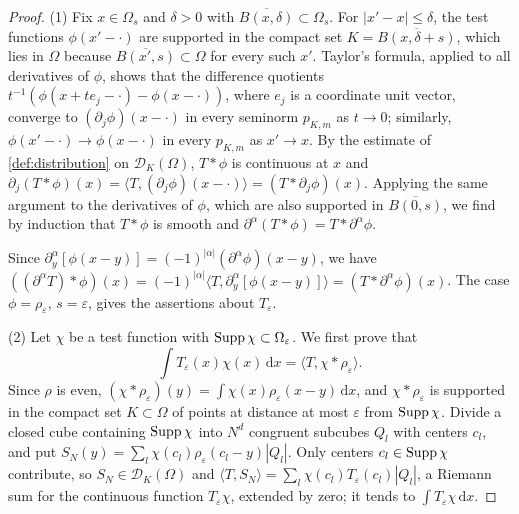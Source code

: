 \begin{proof}
(1) Fix $x\in\Omega_s$ and $\delta>0$ with $\overline{B(x,\delta)}\subset\Omega_s$. For $|x'-x|\leq\delta$, the test functions $\phi(x'-\cdot)$ are supported in the compact set $K=\overline{B(x,\delta+s)}$, which lies in $\Omega$ because $\overline{B(x',s)}\subset\Omega$ for every such $x'$. Taylor's formula, applied to all derivatives of $\phi$, shows that the difference quotients $t^{-1}(\phi(x+te_j-\cdot)-\phi(x-\cdot))$, where $e_j$ is a coordinate unit vector, converge to $(\partial_j\phi)(x-\cdot)$ in every seminorm $p_{K,m}$ as $t\to0$; similarly, $\phi(x'-\cdot)\to\phi(x-\cdot)$ in every $p_{K,m}$ as $x'\to x$. By the estimate of \cref{def:distribution} on $\mathcal D_K(\Omega)$, $T*\phi$ is continuous at $x$ and $\partial_j(T*\phi)(x)=\langle T,(\partial_j\phi)(x-\cdot)\rangle=(T*\partial_j\phi)(x)$. Applying the same argument to the derivatives of $\phi$, which are also supported in $\overline{B(0,s)}$, we find by induction that $T*\phi$ is smooth and $\partial^\alpha(T*\phi)=T*\partial^\alpha\phi$.

Since $\partial_y^\alpha[\phi(x-y)]=(-1)^{|\alpha|}(\partial^\alpha\phi)(x-y)$, we have $((\partial^\alpha T)*\phi)(x)=(-1)^{|\alpha|}\langle T,\partial_y^\alpha[\phi(x-y)]\rangle=(T*\partial^\alpha\phi)(x)$. The case $\phi=\rho_\varepsilon$, $s=\varepsilon$, gives the assertions about $T_\varepsilon$.

(2) Let $\chi$ be a test function with $\operatorname{Supp}\chi\subset\Omega_\varepsilon$. We first prove that
\begin{equation}\label{eq:distribution-convolution-pairing}
 \int T_\varepsilon(x)\chi(x)\,\mathrm d x
 =\langle T,\chi*\rho_\varepsilon\rangle.
\end{equation}
Since $\rho$ is even, $(\chi*\rho_\varepsilon)(y)=\int\chi(x)\rho_\varepsilon(x-y)\,\mathrm dx$, and $\chi*\rho_\varepsilon$ is supported in the compact set $K\subset\Omega$ of points at distance at most $\varepsilon$ from $\operatorname{Supp}\chi$. Divide a closed cube containing $\operatorname{Supp}\chi$ into $N^d$ congruent subcubes $Q_l$ with centers $c_l$, and put $S_N(y)=\sum_l\chi(c_l)\rho_\varepsilon(c_l-y)|Q_l|$. Only centers $c_l\in\operatorname{Supp}\chi$ contribute, so $S_N\in\mathcal D_K(\Omega)$ and $\langle T,S_N\rangle=\sum_l\chi(c_l)T_\varepsilon(c_l)|Q_l|$, a Riemann sum for the continuous function $T_\varepsilon\chi$, extended by zero; it tends to $\int T_\varepsilon\chi\,\mathrm dx$.


\end{proof}
